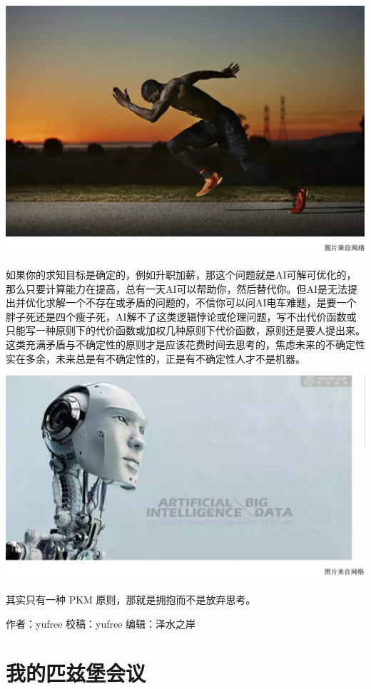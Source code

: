 \documentclass[
]{book}
\begin{document}
\includegraphics[width=8.33in]{images/gtd4}

如果你的求知目标是确定的，例如升职加薪，那这个问题就是AI可解可优化的，那么只要计算能力在提高，总有一天AI可以帮助你，然后替代你。但AI是无法提出并优化求解一个不存在或矛盾的问题的，不信你可以问AI电车难题，是要一个胖子死还是四个瘦子死，AI解不了这类逻辑悖论或伦理问题，写不出代价函数或只能写一种原则下的代价函数或加权几种原则下代价函数，原则还是要人提出来。这类充满矛盾与不确定性的原则才是应该花费时间去思考的，焦虑未来的不确定性实在多余，未来总是有不确定性的，正是有不确定性人才不是机器。

\includegraphics[width=8.33in]{images/gtd5}

其实只有一种 PKM 原则，那就是拥抱而不是放弃思考。

作者：yufree
校稿：yufree
编辑：泽水之岸

\hypertarget{ux6211ux7684ux5339ux5179ux5821ux4f1aux8bae}{%
\section{我的匹兹堡会议}\label{ux6211ux7684ux5339ux5179ux5821ux4f1aux8bae}}
\end{document}
